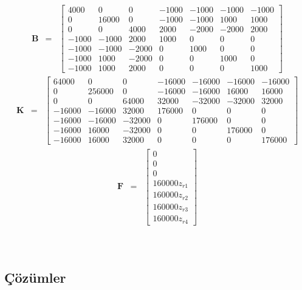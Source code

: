 \documentclass[a4paper]{report}
\begin{document}
\begin{eqnarray*}
\mathbf{B}&=&\left[\begin{array}{ccccccc} 4000 & 0 & 0 & -1000 & -1000 & -1000 & -1000\\ 0 & 16000 & 0 & -1000 & -1000 & 1000 & 1000\\ 0 & 0 & 4000 & 2000 & -2000 & -2000 & 2000\\ -1000 & -1000 & 2000 & 1000 & 0 & 0 & 0\\ -1000 & -1000 & -2000 & 0 & 1000 & 0 & 0\\ -1000 & 1000 & -2000 & 0 & 0 & 1000 & 0\\ -1000 & 1000 & 2000 & 0 & 0 & 0 & 1000 \end{array}\right]
\end{eqnarray*}
\begin{eqnarray*}
\mathbf{K}&=&
\left[\begin{array}{ccccccc} 64000 & 0 & 0 & -16000 & -16000 & -16000 & -16000\\ 0 & 256000 & 0 & -16000 & -16000 & 16000 & 16000\\ 0 & 0 & 64000 & 32000 & -32000 & -32000 & 32000\\ -16000 & -16000 & 32000 & 176000 & 0 & 0 & 0\\ -16000 & -16000 & -32000 & 0 & 176000 & 0 & 0\\ -16000 & 16000 & -32000 & 0 & 0 & 176000 & 0\\ -16000 & 16000 & 32000 & 0 & 0 & 0 & 176000 \end{array}\right]
\end{eqnarray*}
\begin{eqnarray*}
\mathbf{F}&=&
\left[
\begin{array}{c}
0\\
0\\
0\\
160000 z_{r1}\\
160000 z_{r2}\\
160000 z_{r3}\\
160000 z_{r4}
\end{array}
\right]
\end{eqnarray*}
\\
~\\
\begin{center}
\clearpage
\section*{Çözümler}
\end{center}
\end{document}
